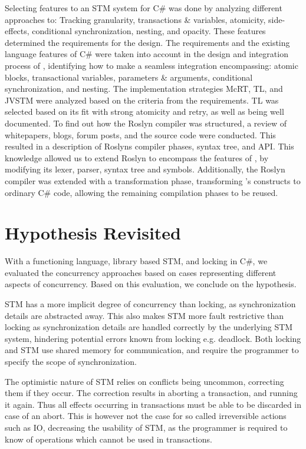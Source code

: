 Selecting features to an \ac{STM} system for C\# was done by analyzing different approaches to: Tracking granularity, transactions \& variables, atomicity, side-effects, conditional synchronization, nesting, and opacity. These features determined the requirements for the design. The requirements and the existing language features of C\# were taken into account in the design and integration process of \stmname, identifying how to make a seamless integration encompassing: atomic blocks, transactional variables, parameters \& arguments, conditional synchronization, and nesting. The implementation strategies McRT, TL, and JVSTM were analyzed based on the criteria from the requirements. TL was selected based on its fit with strong atomicity and retry, as well as being well documented. To find out how the Roslyn compiler was structured, a review of whitepapers, blogs, forum posts, and the source code were conducted. This resulted in a description of Roslyns compiler phases, syntax tree, and \ac{API}. This knowledge allowed us to extend Roslyn to encompass the features of \stmname, by modifying its lexer, parser, syntax tree and symbols. Additionally, the Roslyn compiler was extended with a transformation phase, transforming \stmname's constructs to ordinary C\# code, allowing the remaining compilation phases to be reused.

\section{Hypothesis Revisited}
With a functioning \stmname language, library based \ac{STM}, and locking in C\#, we evaluated the concurrency approaches based on cases representing different aspects of concurrency. Based on this evaluation, we conclude on the hypothesis.

\ac{STM} has a more implicit degree of concurrency than locking, as synchronization details are abstracted away. This also makes \ac{STM} more fault restrictive than locking as synchronization details are handled correctly by the underlying \ac{STM} system, hindering potential errors known from locking e.g. deadlock. Both locking and \ac{STM} use shared memory for communication, and require the programmer to specify the scope of synchronization.

The optimistic nature of \ac{STM} relies on conflicts being uncommon,  correcting them if they occur. The correction results in aborting a transaction, and running it again. Thus all effects occurring in transactions must be able to be discarded in case of an abort. This is however not the case for so called irreversible actions such as \ac{IO},  decreasing the usability of \ac{STM}, as the programmer is required to know of operations which cannot be used in transactions.

